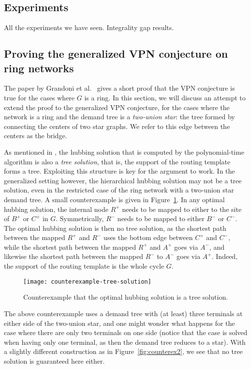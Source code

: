 \subsection{Experiments}
All the experiments we have seen.
Integrality gap results.

\subsection{Proving the generalized VPN conjecture on ring networks}
The paper by Grandoni et al.~\cite{grandoni2008short} gives a short proof that the VPN conjecture is true for the cases where $G$ is a ring.
In this section, we will discuss an attempt to extend the proof to the generalized VPN conjecture, for the cases where the network is a ring and the demand tree is a \emph{two-union star}: the tree formed by connecting the centers of two star graphs.
We refer to this edge between the centers as the bridge.

As mentioned in \cite{grandoni2008short}, the hubbing solution that is computed by the polynomial-time algorithm is also a \emph{tree solution}, that is, the support of the routing template forms a tree.
Exploiting this structure is key for the argument to work.
In the generalized setting however, the hierarchical hubbing solution may not be a tree solution, even in the restricted case of the ring network with a two-union star demand tree.
A small counterexample is given in Figure~\ref{fig:counterex-tree-solution}.
In any optimal hubbing solution, the internal node $R^+$ needs to be mapped to either to the site of $B^+$ or $C^+$ in $G$.
Symmetrically, $R^-$ needs to be mapped to either $B^-$ or $C^-$.
The optimal hubbing solution is then no tree solution, as the shortest path between the mapped $R^+$ and $R^-$ uses the bottom edge between $C^+$ and $C^-$, while the shortest path between the mapped $R^+$ and $A^+$ goes via $A^-$, and likewise the shortest path between the mapped $R^-$ to $A^-$ goes via $A^+$.
Indeed, the support of the routing template is the whole cycle $G$.

\begin{figure}
    \centering
    \texttt{[image: counterexample-tree-solution]}
    \caption{Counterexample that the optimal hubbing solution is a tree solution.} \label{fig:counterex-tree-solution}
\end{figure}

The above counterexample uses a demand tree with (at least) three terminals at either side of the two-union star, and one might wonder what happens for the case where there are only two terminals on one side (notice that the case is solved when having only one terminal, as then the demand tree reduces to a star).
With a slightly different construction as in Figure~\ref{fig:counterex2}, we see that no tree solution is guaranteed here either. %

